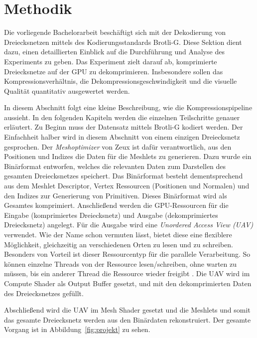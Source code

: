 \section{Methodik}
\label{sec:methodik}
Die vorliegende Bachelorarbeit beschäftigt sich mit der Dekodierung von Dreiecksnetzen mittels des Kodierungsstandards Brotli-G.
Diese Sektion dient dazu, einen detaillierten Einblick auf die Durchführung und Analyse des Experiments zu geben.
Das Experiment zielt darauf ab, komprimierte Dreiecksnetze auf der GPU zu dekomprimieren.
Insbesondere sollen das Kompressionsverhältnis, die Dekompressionsgeschwindigkeit und die visuelle Qualität quantitativ ausgewertet werden. \newline

In diesem Abschnitt folgt eine kleine Beschreibung, wie die Kompressionspipeline aussieht.
In den folgenden Kapiteln werden die einzelnen Teilschritte genauer erläutert. \newline
Zu Beginn muss der Datensatz mittels Brotli-G kodiert werden.
Der Einfachheit halber wird in diesem Abschnitt von einem einzigen Dreiecksnetz gesprochen.
Der \textit{Meshoptimizer} von Zeux \cite{Zeux} ist dafür verantwortlich, aus den Positionen und Indizes die Daten für die Meshlets zu generieren.
Dazu wurde ein Binärformat entworfen, welches die relevanten Daten zum Darstellen des gesamten Dreiecksnetzes speichert.
Das Binärformat besteht dementsprechend aus dem Meshlet Descriptor, Vertex Ressourcen (Positionen und Normalen) und den Indizes zur Generierung von Primitiven. \newline
Dieses Binärformat wird als Gesamtes komprimiert.
Anschließend werden die GPU-Ressourcen für die Eingabe (komprimiertes Dreiecksnetz) und Ausgabe (dekomprimiertes Dreiecksnetz) angelegt. \newline
Für die Ausgabe wird eine \textit{Unordered Access View (UAV)} verwendet.
Wie der Name schon vermuten lässt, bietet diese eine flexiblere Möglichkeit, gleichzeitig an verschiedenen Orten zu lesen und zu schreiben.
Besonders von Vorteil ist dieser Ressourcentyp für die parallele Verarbeitung.
So können einzelne Threads von der Ressource lesen/schreiben, ohne warten zu müssen, bis ein anderer Thread die Ressource wieder freigibt \cite{Microsoft2021}. \newline
Die UAV wird im Compute Shader als Output Buffer gesetzt, und mit den dekomprimierten Daten des Dreiecksnetzes gefüllt.

Abschließend wird die UAV im Mesh Shader gesetzt und die Meshlets und somit das gesamte Dreiecksnetz werden aus den Binärdaten rekonstruiert. \newline
Der gesamte Vorgang ist in Abbildung~\ref{fig:projekt} zu sehen.

